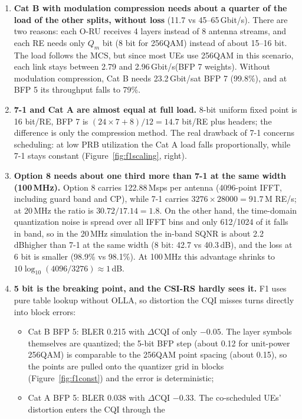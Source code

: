 \documentclass[11pt,a4paper]{article}
\newcommand{\dB}{\,dB}
\newcommand{\Gbps}{\,Gbit/s}
\begin{document}
\begin{enumerate}
  \item \textbf{Cat B with modulation compression needs about a quarter of the load of the other splits, without loss}
        (11.7 vs 45--65\Gbps). There are two reasons: each O-RU receives 4 layers instead of 8 antenna streams, and each RE needs
        only $Q_m$ bit (8 bit for 256QAM) instead of about 15--16 bit. The load follows the MCS, but since most UEs use 256QAM in
        this scenario, each link stays between 2.79 and 2.96\Gbps (BFP 7 weights). Without modulation compression, Cat B needs
        23.2\Gbps at BFP 7 (99.8\%), and at BFP 5 its throughput falls to 79\%.
  \item \textbf{7-1 and Cat A are almost equal at full load.} 8-bit uniform fixed point is 16 bit/RE, BFP 7 is
        $(24\times7+8)/12 = 14.7$ bit/RE plus headers; the difference is only the compression method. The real drawback of 7-1
        concerns scheduling: at low PRB utilization the Cat A load falls proportionally, while 7-1 stays constant
        (Figure~\ref{fig:f1scaling}, right).
  \item \textbf{Option 8 needs about one third more than 7-1 at the same width (100\,MHz).} Option 8 carries 122.88\,Msps per
        antenna (4096-point IFFT, including guard band and CP), while 7-1 carries $3276 \times 28000 = 91.7$\,M RE/s; at 20\,MHz the
        ratio is $30.72/17.14 = 1.8$. On the other hand, the time-domain quantization noise is spread over all IFFT bins and only
        612/1024 of it falls in band, so in the 20\,MHz simulation the in-band SQNR is about 2.2\dB higher than 7-1 at the same width
        (8 bit: 42.7 vs 40.3\dB), and the loss at 6 bit is smaller (98.9\% vs 98.1\%). At 100\,MHz this advantage shrinks to
        $10\log_{10}(4096/3276) \approx 1$\dB.
  \item \textbf{5 bit is the breaking point, and the CSI-RS hardly sees it.} F1 uses pure table lookup without OLLA, so distortion
        the CQI misses turns directly into block errors:
        \begin{itemize}
          \item Cat B BFP 5: BLER 0.215 with $\Delta$CQI of only $-0.05$. The layer symbols themselves are quantized; the 5-bit BFP
                step (about 0.12 for unit-power 256QAM) is comparable to the 256QAM point spacing (about 0.15), so the points are
                pulled onto the quantizer grid in blocks (Figure~\ref{fig:f1const}) and the error is deterministic;
          \item Cat A BFP 5: BLER 0.038 with $\Delta$CQI $-0.33$. The co-scheduled UEs' distortion enters the CQI through the

\end{itemize}
\end{enumerate}
\end{document}
